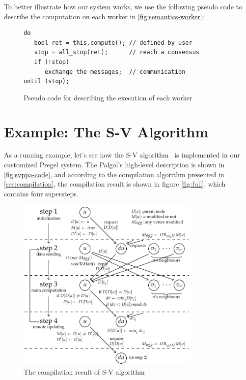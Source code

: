 \documentclass{sokendai_thesis} %
\begin{document}
To better illustrate how our system works, we use the following pseudo code to describe the computation on each worker in \autoref{fig:semantics-worker}:

\begin{figure}[ht]
\centering
\vspace{-2ex}
\begin{lstlisting}[basicstyle=\small\ttfamily,numbers=none,xleftmargin=0.1\textwidth]
do
   bool ret = this.compute(); // defined by user
   stop = all_stop(ret);      // reach a consensus
   if (!stop)
      exchange the messages;  // communication
until (stop);
\end{lstlisting}
\vspace{-2ex}
\caption{Pseudo code for describing the execution of each worker}
\label{fig:semantics-worker}
\end{figure}

\section{Example: The S-V Algorithm}

As a running example, let's see how the S-V algorithm~\cite{connectivity} is implemented in our customized Pregel system.
The Palgol's high-level description is shown in \autoref{fig:svppa-code}, and according to the compilation algorithm presented in \autoref{sec:compilation}, the compilation result is shown in figure \autoref{fig:full}, which contains four supersteps.

\begin{figure}[ht]
 \centering
 \includegraphics[width=0.8\textwidth]{figures/svppa.pdf}
 \caption{The compilation result of S-V algorithm}
 \label{fig:full}
\end{figure}
\end{document}
